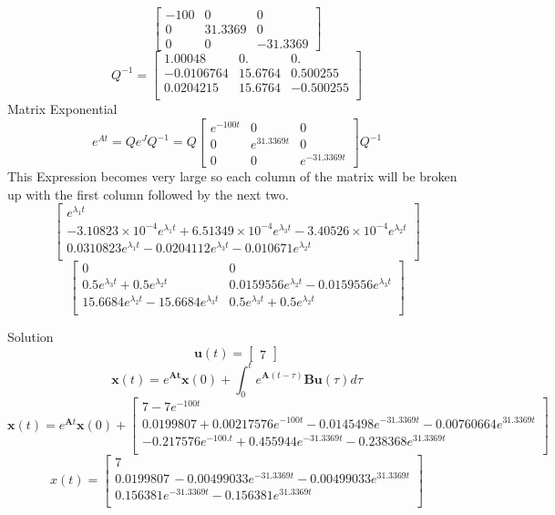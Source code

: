 \documentclass{article}
\begin{document}
\begin{enumerate}[a.]
$$\begin{bmatrix}
-100 & 0 & 0 \\
0 & 31.3369 & 0 \\
0 & 0 & -31.3369
\end{bmatrix}
$$
$$
Q^{-1}
=
\begin{bmatrix}
1.00048 & 0. & 0. \\
-0.0106764 & 15.6764 & 0.500255 \\
 0.0204215 & 15.6764 & -0.500255 \\
\end{bmatrix}
$$
Matrix Exponential
$$ e^{At} = Qe^JQ^{-1}
=
Q
\begin{bmatrix}
e^{-100t} & 0 & 0 \\
0 & e^{31.3369t} & 0 \\
0 & 0 & e^{-31.3369t}
\end{bmatrix}
Q^{-1}
$$
This Expression becomes very large so each column of the matrix will be broken up with the first column followed by the next two.
$$
\begin{bmatrix}
e^{\lambda_1 t} 																								\\
-3.10823\times 10^{-4} e^{\lambda_1 t}+6.51349\times 10^{-4} e^{\lambda_3 t}-3.40526\times 10^{-4} e^{\lambda_2 t} \\
 0.0310823 e^{\lambda_1 t}-0.0204112 e^{\lambda_3 t}-0.010671 e^{\lambda_2 t} 										\\
\end{bmatrix}
$$
$$
\begin{bmatrix}
0 								   			& 0 \\
0.5 e^{\lambda_3 t}+0.5 e^{\lambda_2 t} 			& 0.0159556 e^{\lambda_2 t}-0.0159556 e^{\lambda_3 t} \\
15.6684 e^{\lambda_2 t}-15.6684 e^{\lambda_3 t} 	& 0.5 e^{\lambda_3 t}+0.5 e^{\lambda_2 t} \\
\end{bmatrix}
$$

Solution
$$\mathbf{u}(t) = \begin{bmatrix} 7 \end{bmatrix} $$
$$
\mathbf{x}(t)
=
e^{\mathbf{At}}\mathbf{x}(0) + \int_0^t e^{\mathbf{A}(t-\tau)}\mathbf{B}\mathbf{u}(\tau) d\tau
$$
$$
\mathbf{x}(t)
=
e^{\mathbf{A}t}\mathbf{x}(0)
+
\begin{bmatrix}
7 -7 e^{-100 t} \\
0.0199807 +0.00217576 e^{-100 t}-0.0145498 e^{-31.3369 t}-0.00760664 e^{31.3369 t} \\
-0.217576 e^{-100. t}+0.455944 e^{-31.3369 t}-0.238368 e^{31.3369 t} \\
\end{bmatrix}
$$
$$
x(t) =
\begin{bmatrix}
7 \\
0.0199807\, -0.00499033 e^{-31.3369 t}-0.00499033 e^{31.3369 t} \\
0.156381 e^{-31.3369 t}-0.156381 e^{31.3369 t} \\
\end{bmatrix}
$$


\end{enumerate}
\end{document}
